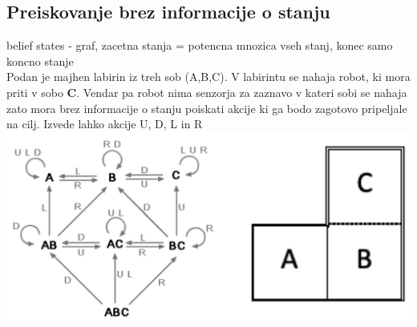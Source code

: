 \subsection{Preiskovanje brez informacije o stanju}
belief states - graf, zacetna stanja = potencna mnozica vseh stanj, konec samo koncno stanje\\
Podan je majhen labirin iz treh sob (A,B,C). V labirintu se nahaja robot, ki mora 
priti v sobo \textbf{C}. Vendar pa robot nima senzorja za zaznavo v kateri sobi se nahaja
zato mora brez informacije o stanju poiskati akcije ki ga bodo zagotovo pripeljale na cilj.
Izvede lahko akcije U, D, L in R
\includegraphics[width=\columnwidth]{images/nedeterministicno-preiskovanje.png}

